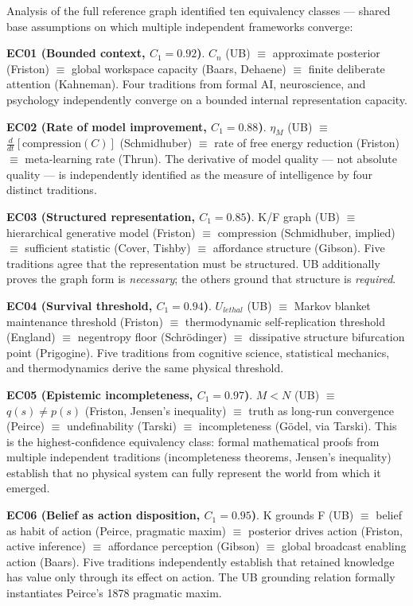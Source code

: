 \documentclass[
]{article}
\begin{document}
Analysis of the full reference graph identified ten equivalency classes
--- shared base assumptions on which multiple independent frameworks
converge:

\textbf{EC01 (Bounded context, \(C_1 = 0.92\))}. \(C_n\) (UB) \(\equiv\)
approximate posterior (Friston) \(\equiv\) global workspace capacity
(Baars, Dehaene) \(\equiv\) finite deliberate attention (Kahneman). Four
traditions from formal AI, neuroscience, and psychology independently
converge on a bounded internal representation capacity.

\textbf{EC02 (Rate of model improvement, \(C_1 = 0.88\))}. \(\eta_M\)
(UB) \(\equiv\) \(\frac{d}{dt}[\text{compression}(C)]\) (Schmidhuber)
\(\equiv\) rate of free energy reduction (Friston) \(\equiv\)
meta-learning rate (Thrun). The derivative of model quality --- not
absolute quality --- is independently identified as the measure of
intelligence by four distinct traditions.

\textbf{EC03 (Structured representation, \(C_1 = 0.85\))}. K/F graph
(UB) \(\equiv\) hierarchical generative model (Friston) \(\equiv\)
compression (Schmidhuber, implied) \(\equiv\) sufficient statistic
(Cover, Tishby) \(\equiv\) affordance structure (Gibson). Five
traditions agree that the representation must be structured. UB
additionally proves the graph form is \emph{necessary}; the others
ground that structure is \emph{required}.

\textbf{EC04 (Survival threshold, \(C_1 = 0.94\))}. \(U_{lethal}\) (UB)
\(\equiv\) Markov blanket maintenance threshold (Friston) \(\equiv\)
thermodynamic self-replication threshold (England) \(\equiv\) negentropy
floor (Schrödinger) \(\equiv\) dissipative structure bifurcation point
(Prigogine). Five traditions from cognitive science, statistical
mechanics, and thermodynamics derive the same physical threshold.

\textbf{EC05 (Epistemic incompleteness, \(C_1 = 0.97\))}. \(M < N\) (UB)
\(\equiv\) \(q(s) \neq p(s)\) (Friston, Jensen's inequality) \(\equiv\)
truth as long-run convergence (Peirce) \(\equiv\) undefinability
(Tarski) \(\equiv\) incompleteness (Gödel, via Tarski). This is the
highest-confidence equivalency class: formal mathematical proofs from
multiple independent traditions (incompleteness theorems, Jensen's
inequality) establish that no physical system can fully represent the
world from which it emerged.

\textbf{EC06 (Belief as action disposition, \(C_1 = 0.95\))}. K grounds
F (UB) \(\equiv\) belief as habit of action (Peirce, pragmatic maxim)
\(\equiv\) posterior drives action (Friston, active inference)
\(\equiv\) affordance perception (Gibson) \(\equiv\) global broadcast
enabling action (Baars). Five traditions independently establish that
retained knowledge has value only through its effect on action. The UB
grounding relation formally instantiates Peirce's 1878 pragmatic maxim.
\end{document}

